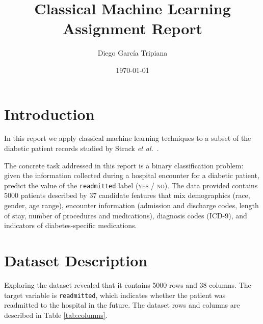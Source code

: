 \documentclass[11pt,a4paper]{article}
\title{Classical Machine Learning Assignment Report}
\author{Diego García Tripiana}
\date{\today}
\begin{document}
\maketitle

\section{Introduction}

In this report we apply classical machine learning techniques to a subset of the
diabetic patient records studied by Strack \emph{et al.}~\cite{strack2014}.

The concrete task addressed in this report is a binary classification problem:
given the information collected during a hospital encounter for a diabetic patient,
predict the value of the \texttt{readmitted} label (\textsc{yes} / \textsc{no}). The
data provided contains 5000 patients described by 37 candidate features that mix
demographics (race, gender, age range), encounter information (admission and
discharge codes, length of stay, number of procedures and medications), diagnosis
codes (ICD-9), and indicators of diabetes-specific medications.

\section{Dataset Description}

Exploring the dataset revealed that it contains 5000 rows and 38 columns.
The target variable is \texttt{readmitted}, which indicates whether the
patient was readmitted to the hospital in the future.
The dataset rows and columns are described in Table \ref{tab:columns}.
\end{document}
